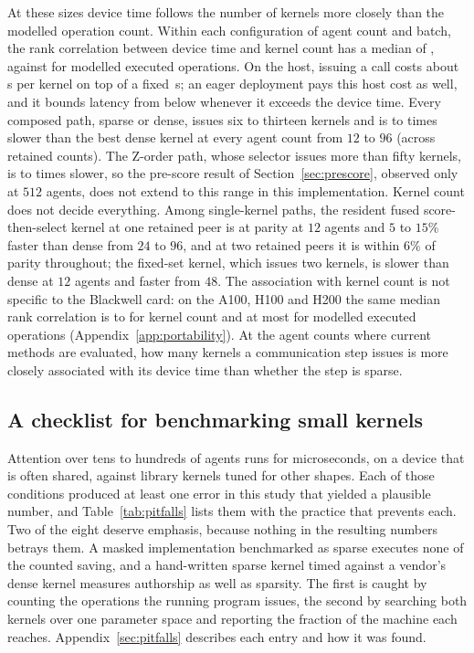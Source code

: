 At these sizes device time follows the number of kernels more closely than the
modelled operation count. Within each configuration of agent count and
batch, the rank correlation between device time and kernel count has a median
of \SmallNRhoLaunch{}, against \SmallNRhoFlops{} for modelled executed
operations. On the host, issuing a call costs about \SmallNPerLaunch{}\,\textmu s
per kernel on top of a fixed \SmallNHostFixed{}\,\textmu s; an eager deployment
pays this host cost as well, and it bounds latency from below whenever it
exceeds the device time. Every composed path, sparse or dense, issues six to
thirteen kernels and is \SmallNComposedLo{} to \SmallNComposedHi{} times slower
than the best dense kernel at every agent count from $12$ to $96$ (across
retained counts). The Z-order path, whose selector issues more than fifty
kernels, is \SmallNZorderLo{} to \SmallNZorderHi{} times slower, so the
pre-score result of Section~\ref{sec:prescore}, observed only at $512$ agents,
does not extend to this range in this implementation. Kernel count does not
decide everything. Among single-kernel paths, the resident fused
score-then-select kernel at one retained peer is at parity at $12$ agents and
$5$ to $15\%$ faster than dense from $24$ to $96$, and at two retained peers it
is within $6\%$ of parity throughout; the fixed-set kernel, which issues two
kernels, is slower than dense at $12$ agents and faster from $48$. The
association with kernel count is not specific to the Blackwell card: on the
A100, H100 and H200 the same median rank correlation is
\PortSmallNRhoLaunchLo{} to \PortSmallNRhoLaunchHi{} for kernel count and at
most \PortSmallNRhoFlopsHi{} for modelled executed operations
(Appendix~\ref{app:portability}). At the agent counts where current methods are
evaluated, how many kernels a communication step issues is more closely
associated with its device time than whether the step is sparse.

\subsection{A checklist for benchmarking small kernels}
\label{sec:checklist}

Attention over tens to hundreds of agents runs for microseconds, on a device
that is often shared, against library kernels tuned for other shapes. Each of
those conditions produced at least one error in this study that yielded a
plausible number, and Table~\ref{tab:pitfalls} lists them with the practice that
prevents each. Two of the eight deserve emphasis, because nothing in the
resulting numbers betrays them. A masked implementation benchmarked as sparse
executes none of the counted saving, and a hand-written sparse kernel timed
against a vendor's dense kernel measures authorship as well as sparsity. The
first is caught by counting the operations the running program issues, the
second by searching both kernels over one parameter space and reporting the
fraction of the machine each reaches. Appendix~\ref{sec:pitfalls} describes each
entry and how it was found.

